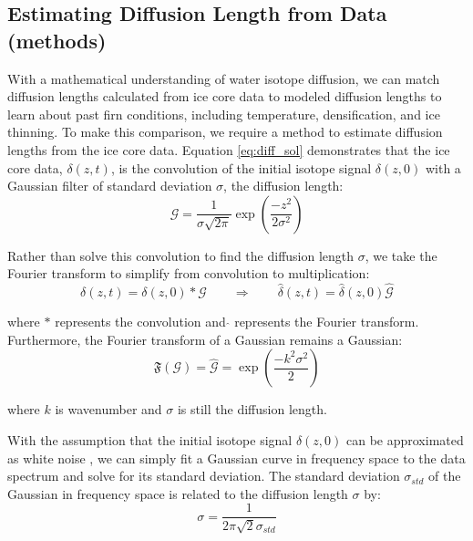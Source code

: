 \documentclass[draft, jgrga]{AGUTeX}
\begin{document}
\begin{article}

\section{Estimating Diffusion Length from Data (methods)}

With a mathematical understanding of water isotope diffusion, we can match diffusion lengths calculated from ice core data to modeled diffusion lengths to learn about past firn conditions, including temperature, densification, and ice thinning. To make this comparison, we require a method to estimate diffusion lengths from the ice core data. Equation \ref{eq:diff_sol} demonstrates that the ice core data, $\delta(z,t)$, is the convolution of the initial isotope signal $\delta(z,0)$ with a Gaussian filter of standard deviation $\sigma$, the diffusion length:
\begin{equation}
\mathcal{G} = \frac{1}{\sigma \sqrt{2\pi}} \exp \left( \frac{-z^2}{2\sigma^2} \right)
\end{equation}

Rather than solve this convolution to find the diffusion length $\sigma$, we take the Fourier transform to simplify from convolution to multiplication:
\begin{equation}
  \delta(z,t) = \delta(z,0)*\mathcal{G} \qquad \Rightarrow \qquad \hat{\delta}(z,t) = \hat{\delta}(z,0)\hat{\mathcal{G}}
\end{equation}

where $*$ represents the convolution and \quad $\hat{}$ \quad represents the Fourier transform. Furthermore, the Fourier transform of a Gaussian remains a Gaussian:
\begin{equation}
\mathfrak{F}(\mathcal{G}) = \hat{\mathcal{G}} = \exp \left( \frac{-k^2\sigma^2}{2} \right)
\end{equation}

where $k$ is wavenumber and $\sigma$ is still the diffusion length.

With the assumption that the initial isotope signal $\delta(z,0)$ can be approximated as white noise \citep{Gkinis2014}, we can simply fit a Gaussian curve in frequency space to the data spectrum and solve for its standard deviation. The standard deviation $\sigma_{std}$ of the Gaussian in frequency space is related to the diffusion length $\sigma$ by:
\begin{equation}
  \sigma = \frac{1}{2\pi\sqrt{2}\sigma_{std}}
\end{equation}


\end{article}
\end{document}
